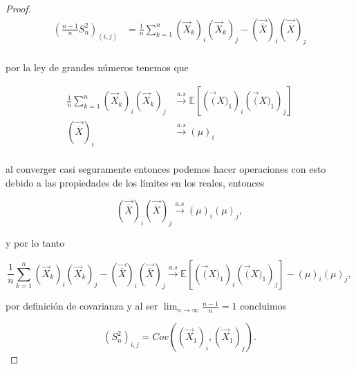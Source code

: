 \documentclass[letterpaper]{article}
\theoremstyle{definition}
\theoremstyle{lemathm}
\theoremstyle{lemademthm}
\newcommand{\limninf}{\lim_{n\to\infty}}
\newcommand{\pars}[1]{\left( #1 \right) }
\newcommand{\bracs}[1]{\left[ #1 \right] }
\newcommand{\EE}{\mathbb{E}}
\newcommand{\1}{\mathbbm{1}}
\begin{document}
\begin{enumerate}
\begin{itemize}
\begin{proof}
				\begin{align*}
					\pars{\frac{n-1}{n}S_n^2}_{(i,j)} &= \frac{1}{n}\sum_{k=1}^n \pars{\vec{X}_k}_i\pars{\vec{X}_k}_j - \pars{\vec{\overline{X}}}_i\pars{\vec{\overline{X}}}_j\\
				\end{align*}

				por la ley de grandes números tenemos que

				\begin{align*}
					\frac{1}{n}\sum_{k=1}^n \pars{\vec{X}_k}_i\pars{\vec{X}_k}_j &\overset{a.s}{\to} \EE\bracs{\pars{\vec(X)_1}_i\pars{\vec(X)_1}_j}\\
					\pars{\vec{\overline{X}}}_i &\overset{a.s}{\to} \pars{\mu}_i\\
				\end{align*}
				
				al converger casi seguramente entonces podemos hacer operaciones con esto debido a las propiedades de los límites en los reales, entonces

				\[\pars{\vec{\overline{X}}}_i\pars{\vec{\overline{X}}}_j \overset{a.s}{\to} \pars{\mu}_i\pars{\mu}_j,\]

				y por lo tanto

				\[\frac{1}{n}\sum_{k=1}^n \pars{\vec{X}_k}_i\pars{\vec{X}_k}_j - \pars{\vec{\overline{X}}}_i\pars{\vec{\overline{X}}}_j \overset{a.s}{\to} \EE\bracs{\pars{\vec(X)_1}_i\pars{\vec(X)_1}_j} - \pars{\mu}_i\pars{\mu}_j,\]

				por definición de covarianza y al ser $\limninf \frac{n-1}{n} = 1$ concluimos

				\[\pars{S_n^2}_{i,j} = Cov\pars{\pars{\vec{X}_1}_i,\pars{\vec{X}_1}_j}.\]

            \end{proof}
            
        \end{itemize}

    \end{enumerate}

	
\end{document}
